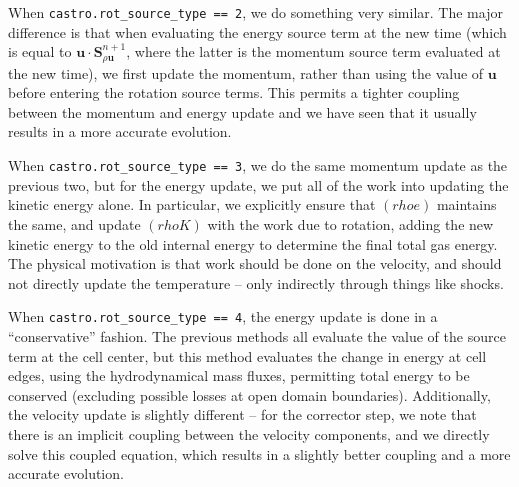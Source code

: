 When {\tt castro.rot\_source\_type == 2}, we do something very similar. The
major difference is that when evaluating the energy source term at the
new time (which is equal to $\mathbf{u} \cdot \mathbf{S}^{n+1}_{\rho \mathbf{u}}$,
where the latter is the momentum source term evaluated at the new time), we first update
the momentum, rather than using the value of $\mathbf{u}$ before entering the
rotation source terms. This permits a tighter coupling between the momentum and
energy update and we have seen that it usually results in a more accurate evolution.

When {\tt castro.rot\_source\_type == 3}, we do the same momentum update as the
previous two, but for the energy update, we put all of the work into updating
the kinetic energy alone. In particular, we explicitly ensure that $(rho e)$ maintains
the same, and update $(rho K)$ with the work due to rotation, adding the new
kinetic energy to the old internal energy to determine the final total gas energy.
The physical motivation is that work should be done on the velocity, and should not
directly update the temperature -- only indirectly through things like shocks.

When {\tt castro.rot\_source\_type == 4}, the energy update is done in a ``conservative'' fashion.
The previous methods all evaluate the value of the source term at the cell center,
but this method evaluates the change in energy at cell edges, using the hydrodynamical mass
fluxes, permitting total energy to be conserved (excluding possible losses at open domain
boundaries). Additionally, the velocity update is slightly different -- for the corrector step,
we note that there is an implicit coupling between the velocity components, and we directly solve
this coupled equation, which results in a slightly better coupling and a more accurate evolution.
